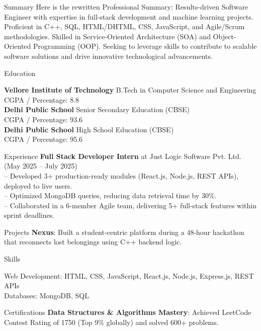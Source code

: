 \documentclass{resume}
\begin{document}
\begin{rSection}{Summary}
Here is the rewritten Professional Summary: Results-driven Software Engineer with expertise in full-stack development and machine learning projects. Proficient in C++, SQL, HTML/DHTML, CSS, JavaScript, and Agile/Scrum methodologies. Skilled in Service-Oriented Architecture (SOA) and Object-Oriented Programming (OOP). Seeking to leverage skills to contribute to scalable software solutions and drive innovative technological advancements.
\end{rSection}

\begin{rSection}{Education}

\textbf{ Vellore Institute of Technology } \hfill B.Tech in Computer Science and Engineering\\
CGPA / Percentage: 8.8\\[6pt]

\textbf{ Delhi Public School } \hfill Senior Secondary Education (CBSE)\\
CGPA / Percentage: 93.6\\[6pt]

\textbf{ Delhi Public School } \hfill High School Education (CBSE)\\
CGPA / Percentage: 95.6\\[6pt]

\end{rSection}

\begin{rSection}{Experience}
\textbf{Full Stack Developer Intern} at Just Logic Software Pvt. Ltd. \hfill (May 2025 -- July 2025)\\
-- Developed 3+ production-ready modules (React.js, Node.js, REST APIs), deployed to live users.\\
-- Optimized MongoDB queries, reducing data retrieval time by 30\%.\\
-- Collaborated in a 6-member Agile team, delivering 5+ full-stack features within sprint deadlines.

\end{rSection}

\begin{rSection}{Projects}
\textbf{Nexus}: Built a student-centric platform during a 48-hour hackathon that reconnects lost belongings using C++ backend logic.
\end{rSection}

\begin{rSection}{Skills}

Web Development: HTML, CSS, JavaScript, React.js, Node.js, Express.js, REST APIs\\

Databases: MongoDB, SQL\\

\end{rSection}

\begin{rSection}{Certifications}
\textbf{Data Structures \& Algorithms Mastery}: Achieved LeetCode Contest Rating of 1750 (Top 9\% globally) and solved 600+ problems.\\
\end{rSection}
\end{document}

